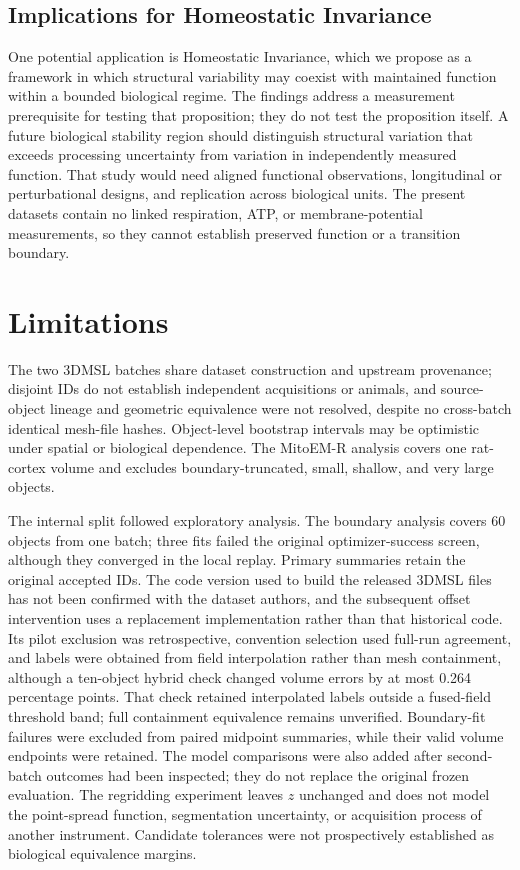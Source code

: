 \documentclass[journal]{IEEEtran}
\begin{document}
\subsection{Implications for Homeostatic Invariance}

One potential application is Homeostatic Invariance, which we propose as a framework in which structural variability may coexist with maintained function within a bounded biological regime. The findings address a measurement prerequisite for testing that proposition; they do not test the proposition itself. A future biological stability region should distinguish structural variation that exceeds processing uncertainty from variation in independently measured function. That study would need aligned functional observations, longitudinal or perturbational designs, and replication across biological units. The present datasets contain no linked respiration, ATP, or membrane-potential measurements, so they cannot establish preserved function or a transition boundary.

\section{Limitations}

The two 3DMSL batches share dataset construction and upstream provenance; disjoint IDs do not establish independent acquisitions or animals, and source-object lineage and geometric equivalence were not resolved, despite no cross-batch identical mesh-file hashes. Object-level bootstrap intervals may be optimistic under spatial or biological dependence. The MitoEM-R analysis covers one rat-cortex volume and excludes boundary-truncated, small, shallow, and very large objects.

The internal split followed exploratory analysis. The boundary analysis covers 60 objects from one batch; three fits failed the original optimizer-success screen, although they converged in the local replay. Primary summaries retain the original accepted IDs. The code version used to build the released 3DMSL files has not been confirmed with the dataset authors, and the subsequent offset intervention uses a replacement implementation rather than that historical code. Its pilot exclusion was retrospective, convention selection used full-run agreement, and labels were obtained from field interpolation rather than mesh containment, although a ten-object hybrid check changed volume errors by at most 0.264 percentage points. That check retained interpolated labels outside a fused-field threshold band; full containment equivalence remains unverified. Boundary-fit failures were excluded from paired midpoint summaries, while their valid volume endpoints were retained. The model comparisons were also added after second-batch outcomes had been inspected; they do not replace the original frozen evaluation. The regridding experiment leaves $z$ unchanged and does not model the point-spread function, segmentation uncertainty, or acquisition process of another instrument. Candidate tolerances were not prospectively established as biological equivalence margins.
\end{document}
